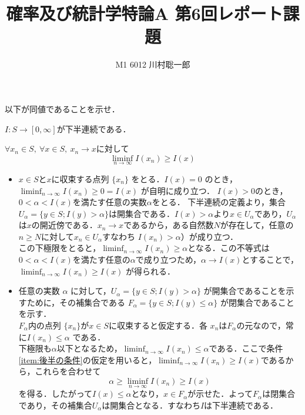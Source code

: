 \documentclass[dvipdfmx]{jsreport}
\title{確率及び統計学特論A 第6回レポート課題}
\author{M1 6012 川村聡一郎}
\date{}
\begin{document}
\maketitle

\begin{tcolorbox}
	以下が同値であることを示せ．
\begin{enumerate_Alpha}
	\item $I\colon S\to [0, \infty]$が下半連続である．
	\item\label{item:後半の条件} $\forall x_n\in S,\ \forall x\in S,\ x_n\to x$に対して
\begin{equation*}
	\liminf_{n\to \infty} I(x_n)\ge I(x)
\end{equation*}
\end{enumerate_Alpha}
\end{tcolorbox}

\begin{souanswer} %
\begin{itemize}
	\item[$\Rightarrow$]
	$x\in S$と$x$に収束する点列 $\{x_n\}$ をとる．$I(x)=0$ のとき，$\liminf_{n\to\infty} I(x_n) \ge 0 = I
(x)$ が自明に成り立つ．
	$I(x)> 0$のとき，$0< \alpha< I(x)$を満たす任意の実数$\alpha$をとる．
	下半連続の定義より，集合$U_\alpha= \{y\in S; I(y)> \alpha\}$は開集合である．$I(x)> \alpha$より$x\in U_\alpha$であり，$U_\alpha$は$x$の開近傍である．$x_n \to x$であるから，ある自然数$N$が存在して，任意の$n\ge N$に対して$x_n\in U_\alpha$すなわち $I(x_n) > \alpha$）が成り立つ．\\
	この下極限をとると，$\liminf_{n\to \infty} I(x_n)\ge \alpha$となる．この不等式は$0< \alpha< I(x)$を満たす任意の$\alpha$で成り立つため，$\alpha\to I(x)$とすることで，$\liminf_{n\to \infty} I(x_n)\ge I(x)$ が得られる．
	\\
	\item[$\Leftarrow$]
	任意の実数 $\alpha$ に対して，$U_\alpha = \{y \in S ; I(y) > \alpha\}$ が開集合であることを示すために，その補集合である $F_\alpha = \{y \in S ; I(y) \le \alpha\}$ が閉集合であることを示す．\\
	$F_\alpha$内の点列 $\{x_n\}$が$x\in S$に収束すると仮定する．各 $x_n$は$F_\alpha$の元なので，常に$I(x_n)\le \alpha$ である．\\
	下極限も$\alpha$以下となるため，$\liminf_{n\to \infty} I(x_n)\le \alpha$である．ここで条件\ref{item:後半の条件}の仮定を用いると，$\liminf_{n\to \infty} I(x_n)\ge I(x)$であるから，これらを合わせて
\begin{equation}
	\alpha\ge \liminf_{n\to \infty} I(x_n) \ge I(x)
\end{equation}
	を得る．したがって$I(x)\le \alpha$となり，$x\in F_\alpha$が示せた．よって$F_\alpha$は閉集合であり，その補集合$U_\alpha$は開集合となる．すなわち$I$は下半連続である．
\end{itemize}
\end{souanswer}
\end{document}

